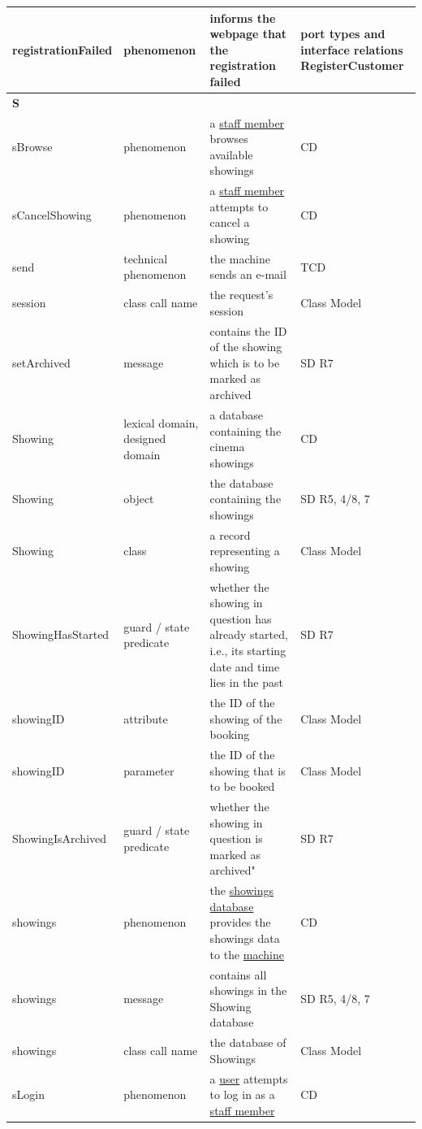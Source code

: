 \documentclass[a4paper,10pt,titlepage,bibtotoc,bibtotocnumbered]{scrreprt}
\begin{document}
\begin{longtable}{|p{.4\linewidth}|p{.2\linewidth}|p{.2\linewidth}|p{.2\linewidth}|}
\hline
registrationFailed & phenomenon & informs the webpage that the registration failed & port types and interface relations RegisterCustomer\\
\hline
\multicolumn{4}{|l|}{\textbf{S}}\\
\hline
\hypertarget{glossary:sBrowse}{sBrowse} & phenomenon & a \hyperlink{glossary:StaffMember}{staff member} browses available showings & CD\\
\hline
\hypertarget{glossary:sCancelShowing}{sCancelShowing} & phenomenon & a \hyperlink{glossary:StaffMember}{staff member} attempts to cancel a showing & CD\\
\hline
send & technical phenomenon & the machine sends an e-mail & TCD\\
\hline
session & class call name & the request's session & Class Model\\
\hline
setArchived & message & contains the ID of the showing which is to be marked as archived & SD R7\\
\hline
\hypertarget{glossary:Showing}{Showing} & lexical domain, designed domain & a database containing the cinema showings & CD\\
\hline
Showing & object & the database containing the showings & SD R5, 4/8, 7\\
\hline
Showing & class & a record representing a showing & Class Model\\
\hline
ShowingHasStarted & guard / state predicate & whether the showing in question has already started, i.e., its starting date and time lies in the past & SD R7\\
\hline
showingID & attribute & the ID of the showing of the booking & Class Model\\
\hline
showingID & parameter & the ID of the showing that is to be booked & Class Model\\
\hline
ShowingIsArchived & guard / state predicate & whether the showing in question is marked as archived" & SD R7\\
\hline
\hypertarget{glossary:showings}{showings} & phenomenon & the \hyperlink{glossary:Showing}{showings database} provides the showings data to the \hyperlink{glossary:UDEKino}{machine} & CD\\
\hline
showings & message & contains all showings in the Showing database & SD R5, 4/8, 7\\
\hline
showings & class call name & the database of Showings & Class Model\\
\hypertarget{glossary:sLogin}{sLogin} & phenomenon & a \hyperlink{glossary:User}{user} attempts to log in as a \hyperlink{glossary:StaffMember}{staff member} & CD\\

\end{longtable}
\end{document}
